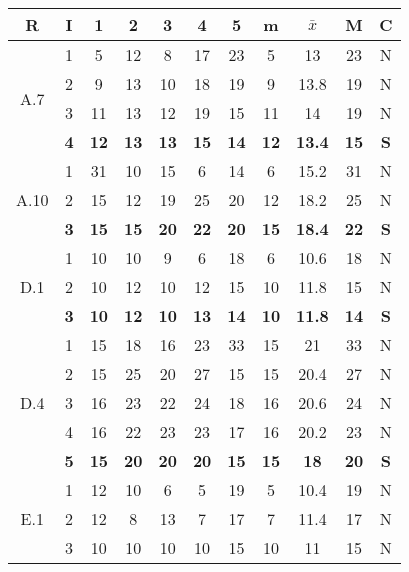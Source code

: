 \documentclass[11pt,a4paper,spanish,twoside]{report}
\begin{document}
\begin{table}[!h]
\centering
  \begin{tabular}{|c|c||c|c|c|c|c||c|c|c||c|}
    \hline
    \textbf{R} & \textbf{I} & \textbf{1} &
    \textbf{2} & \textbf{3} & \textbf{4} & \textbf{5} & \textbf{m}
    &\textbf{$\bar{x}$} &\textbf{M} & \textbf{C}\\
    \hline
    \multirow{4}{*}{A.7} & 1 & 5 & 12 & 8 & 17 & 23 & 5 & 13 & 23 & N \\
    & 2 & 9 & 13 & 10 & 18 & 19 & 9 & 13.8 & 19 & N \\
    & 3 & 11 & 13 & 12 & 19 & 15 & 11 & 14 & 19 & N \\
    & \textbf{4} & \textbf{12} & \textbf{13} & \textbf{13} & \textbf{15} &
    \textbf{14} & \textbf{12} & \textbf{13.4} & \textbf{15} & \textbf{S} \\ 
    \hline
    \multirow{3}{*}{A.10} & 1 & 31 & 10 & 15 & 6 & 14 & 6 & 15.2 & 31 & N \\
    & 2 & 15 & 12 & 19 & 25 & 20 & 12 & 18.2 & 25 & N \\
    & \textbf{3} & \textbf{15} & \textbf{15} & \textbf{20} & \textbf{22} &
    \textbf{20} & \textbf{15} & \textbf{18.4} & \textbf{22} & \textbf{S} \\ 
    \hline
    \multirow{3}{*}{D.1} & 1 & 10 & 10 & 9 & 6 & 18 & 6 & 10.6 & 18 & N \\
    & 2 & 10 & 12 & 10 & 12 & 15 & 10 & 11.8 & 15 & N \\
    & \textbf{3} & \textbf{10} & \textbf{12} & \textbf{10} & \textbf{13} &
    \textbf{14} & \textbf{10} & \textbf{11.8} & \textbf{14} & \textbf{S} \\ 
    \hline
    \multirow{5}{*}{D.4} & 1 & 15 & 18 & 16 & 23 & 33 & 15 & 21 & 33 & N \\
    & 2 & 15 & 25 & 20 & 27 & 15 & 15 & 20.4 & 27 & N \\
    & 3 & 16 & 23 & 22 & 24 & 18 & 16 & 20.6 & 24 & N \\
    & 4 & 16 & 22 & 23 & 23 & 17 & 16 & 20.2 & 23 & N \\
    & \textbf{5} & \textbf{15} & \textbf{20} & \textbf{20} & \textbf{20} &
    \textbf{15} & \textbf{15} & \textbf{18} & \textbf{20} & \textbf{S} \\
    \hline
    \multirow{5}{*}{E.1} & 1 & 12 & 10 & 6 & 5 & 19 & 5 & 10.4 & 19 & N \\
    & 2 & 12 & 8 & 13 & 7 & 17 & 7 & 11.4 & 17 & N \\
    & 3 & 10 & 10 & 10 & 10 & 15 & 10 & 11 & 15 & N \\

\end{tabular}
\end{table}
\end{document}
